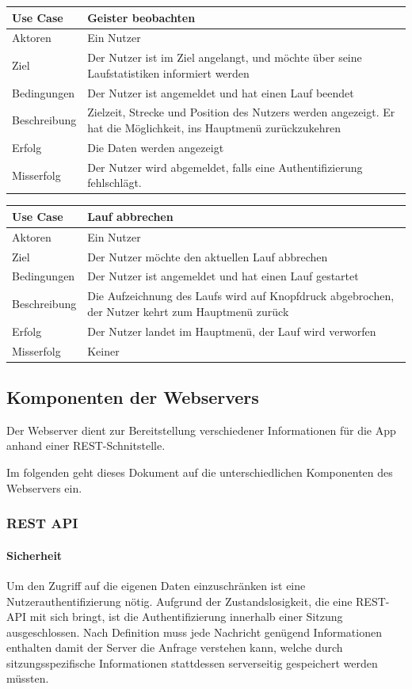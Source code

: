 \begin{tabular}{|p{}|p{}|}
\hline
\textbf{Use Case} & \textbf{Geister beobachten} \\ \hline
Aktoren &  Ein Nutzer \\ \hline
Ziel &  Der Nutzer ist im Ziel angelangt, und möchte über seine Laufstatistiken informiert werden \\ \hline
Bedingungen &  Der Nutzer ist angemeldet und hat einen Lauf beendet \\ \hline
Beschreibung & Zielzeit, Strecke und Position des Nutzers werden angezeigt. Er hat die Möglichkeit, ins Hauptmenü zurückzukehren \\ \hline
Erfolg & Die Daten werden angezeigt \\ \hline
Misserfolg & Der Nutzer wird abgemeldet, falls eine Authentifizierung fehlschlägt. \\ \hline
\hline \end{tabular}
\begin{tabular}{|p{}|p{}|}
\hline
\textbf{Use Case} & \textbf{Lauf abbrechen} \\ \hline
Aktoren &  Ein Nutzer \\ \hline
Ziel &  Der Nutzer möchte den aktuellen Lauf abbrechen \\ \hline
Bedingungen & Der Nutzer ist angemeldet und hat einen Lauf gestartet \\ \hline
Beschreibung & Die Aufzeichnung des Laufs wird auf Knopfdruck abgebrochen, der Nutzer kehrt zum Hauptmenü zurück \\ \hline
Erfolg & Der Nutzer landet im Hauptmenü, der Lauf wird verworfen \\ \hline
Misserfolg & Keiner \\ \hline
\hline \end{tabular}
\subsection{Komponenten der Webservers}
Der Webserver dient zur Bereitstellung verschiedener Informationen für die App anhand einer REST-Schnitstelle. 

Im folgenden geht dieses Dokument auf die unterschiedlichen Komponenten des Webservers ein.
\subsubsection{REST API}
\paragraph{Sicherheit}
Um den Zugriff auf die eigenen Daten einzuschränken ist eine Nutzerauthentifizierung nötig. Aufgrund der Zustandslosigkeit, die eine REST-API mit sich bringt, ist die Authentifizierung innerhalb einer Sitzung ausgeschlossen. Nach Definition muss jede Nachricht genügend Informationen enthalten damit der Server die Anfrage verstehen kann, welche durch sitzungsspezifische Informationen stattdessen serverseitig gespeichert werden müssten.

